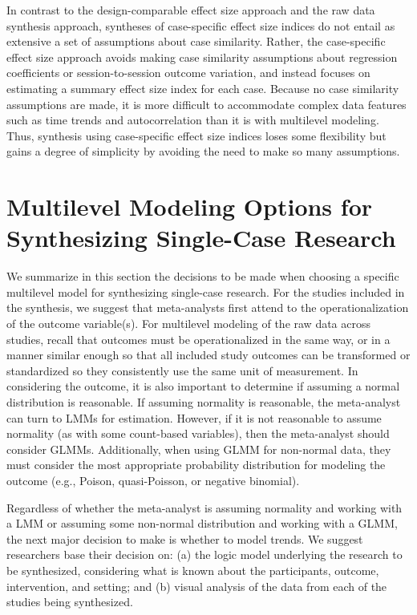 \documentclass[
]{book}
\begin{document}
In contrast to the design-comparable effect size approach and the raw data synthesis approach, syntheses of case-specific effect size indices do not entail as extensive a set of assumptions about case similarity.
Rather, the case-specific effect size approach avoids making case similarity assumptions about regression coefficients or session-to-session outcome variation, and instead focuses on estimating a summary effect size index for each case.
Because no case similarity assumptions are made, it is more difficult to accommodate complex data features such as time trends and autocorrelation than it is with multilevel modeling.
Thus, synthesis using case-specific effect size indices loses some flexibility but gains a degree of simplicity by avoiding the need to make so many assumptions.

\hypertarget{multilevel-modeling-options-for-synthesizing-single-case-research}{%
\section{Multilevel Modeling Options for Synthesizing Single-Case Research}\label{multilevel-modeling-options-for-synthesizing-single-case-research}}

We summarize in this section the decisions to be made when choosing a specific multilevel model for synthesizing single-case research.
For the studies included in the synthesis, we suggest that meta-analysts first attend to the operationalization of the outcome variable(s).
For multilevel modeling of the raw data across studies, recall that outcomes must be operationalized in the same way, or in a manner similar enough so that all included study outcomes can be transformed or standardized so they consistently use the same unit of measurement.
In considering the outcome, it is also important to determine if assuming a normal distribution is reasonable.
If assuming normality is reasonable, the meta-analyst can turn to LMMs for estimation.
However, if it is not reasonable to assume normality (as with some count-based variables), then the meta-analyst should consider GLMMs.
Additionally, when using GLMM for non-normal data, they must consider the most appropriate probability distribution for modeling the outcome (e.g., Poison, quasi-Poisson, or negative binomial).

Regardless of whether the meta-analyst is assuming normality and working with a LMM or assuming some non-normal distribution and working with a GLMM, the next major decision to make is whether to model trends.
We suggest researchers base their decision on:
(a) the logic model underlying the research to be synthesized, considering what is known about the participants, outcome, intervention, and setting; and
(b) visual analysis of the data from each of the studies being synthesized.
\end{document}
